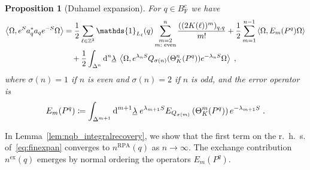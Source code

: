 \documentclass[12pt,a4paper]{article}
\numberwithin{equation}{section}
\newcommand{\1}{\mathbb{I}}
\newcommand{\di}{\textnormal{d}}
\newcommand{\ex}{\mathrm{ex}}
\newcommand{\F}{\mathrm{F}}
\newcommand{\RPA}{\mathrm{RPA}}
\newcommand{\Zstar}{\mathbb{Z}^3} %
\newcommand{\Z}{\mathbb{Z}}
\newcommand{\half}{\frac{1}{2}}
\newcommand{\eva}[1]{\left\langle #1 \right\rangle}
\theoremstyle{plain}
\newtheorem{proposition}[theorem]{Proposition}
\theoremstyle{definition}
\theoremstyle{remark}
\theoremstyle{plain}
\theoremstyle{definition}
\theoremstyle{remark}
\begin{document}
\begin{proposition}[Duhamel expansion]\label{prop:finexpan}
For $q \in B^c_{\F}$ we have
\begin{align} \label{eq:finexpan}
	\eva{\Omega, e^{S} a_q^* a_q e^{-S} \Omega} 
	&= \half\sum_{\ell\in \Zstar}\mathds{1}_{L_\ell}(q) \sum_{\substack{m=2\\m:\textnormal{ even}}}^n \frac{((2K(\ell))^m)_{q,q}}{m!}
		+ \half \sum_{m=1}^{n-1} \eva{\Omega, E_m(P^q)\Omega}\nonumber\\
	&\quad +\half \int_{\Delta^n} \di^n\underline{\lambda} \;
		\eva{\Omega, e^{\lambda_n S}Q_{\sigma(n)}(\Theta^n_{K}(P^q)) e^{-\lambda_n S} \Omega} \;,
\end{align}
where $ \sigma(n) = 1 $ if $n$ is even and $ \sigma(n) = 2 $ if $n$ is odd, and the error operator is
\begin{equation}\label{eq:errEm}
	E_m(P^q) \coloneq \int_{\Delta^{m+1}} \di^{m+1} \underline{\lambda} \;
		e^{\lambda_{m+1} S} E_{Q_{\sigma(m)}}\left(\Theta^{m}_{K}(P^q)\right) e^{-\lambda_{m+1} S} \;.
\end{equation}
\end{proposition}

In Lemma~\ref{lem:nqb_integralrecovery}, we show that the first term on the r.~h.~s. of~\eqref{eq:finexpan} converges to $ n^{\RPA}(q) $ as $ n \to \infty $. The exchange contribution $ n^{\ex}(q) $ emerges by normal ordering the operators $E_m(P^q)$.
\end{document}
